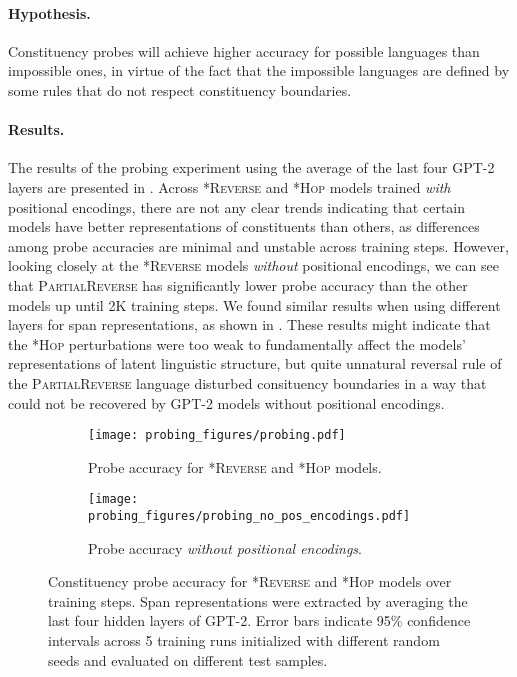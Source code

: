 \documentclass[11pt]{article}
\begin{document}
\paragraph{Hypothesis.}
Constituency probes will achieve higher accuracy for possible languages than impossible ones, in virtue of the fact that the impossible languages are defined by some rules that do not respect constituency boundaries. 

\paragraph{Results.}

The results of the probing experiment using the average of the last four GPT-2 layers are presented in . Across \textsc{*Reverse} and \textsc{*Hop} models trained \emph{with} positional encodings, there are not any clear trends indicating that certain models have better representations of constituents than others, as differences among probe accuracies are minimal and unstable across training steps. However, looking closely at the \textsc{*Reverse} models \emph{without} positional encodings, we can see that \textsc{PartialReverse} has significantly lower probe accuracy than the other models up until 2K training steps. We found similar results when using different layers for span representations, as shown in . These results might indicate that the \textsc{*Hop} perturbations were too weak to fundamentally affect the models' representations of latent linguistic structure, but quite unnatural reversal rule of the \textsc{PartialReverse} language disturbed consituency boundaries in a way that could not be recovered by GPT-2 models without positional encodings.

\begin{figure*}
    \centering
    \begin{subfigure}[t]{0.45\textwidth}
        \texttt{[image: probing\_figures/probing.pdf]}
        \caption{Probe accuracy for \textsc{*Reverse} and \textsc{*Hop} models.}
    \end{subfigure}
    \hspace{1em}
    \begin{subfigure}[t]{0.45\textwidth}
        \texttt{[image: probing\_figures/probing\_no\_pos\_encodings.pdf]}
        \caption{Probe accuracy \emph{without positional encodings}. }
    \end{subfigure}         
    \caption{Constituency probe accuracy for \textsc{*Reverse} and \textsc{*Hop} models over training steps. Span representations were extracted by averaging the last four hidden layers of GPT-2. Error bars indicate 95\% confidence intervals across 5 training runs initialized with different random seeds and evaluated on different test samples.}
    \label{fig:probing}
\end{figure*}
\end{document}
